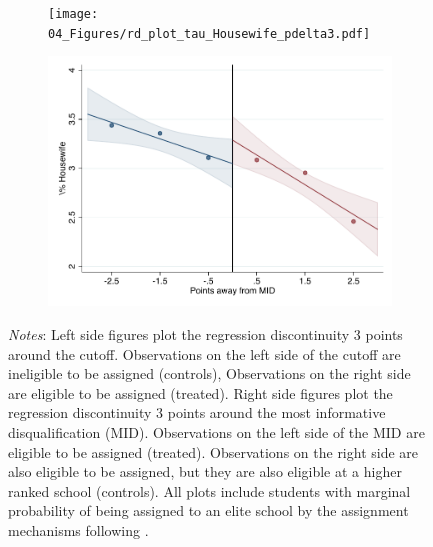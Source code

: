 \documentclass[oneside,11pt]{article}
\begin{document}
\begin{figure}[H]
\begin{center}
    \begin{subfigure}{0.475\textwidth}
        \centering
        \texttt{[image: 04\_Figures/rd\_plot\_tau\_Housewife\_pdelta3.pdf]}
    \end{subfigure}
    \begin{subfigure}{0.475\textwidth}
        \centering
        \includegraphics[width=\textwidth]{04_Figures/rd_plot_mid_Housewife_pdelta3.pdf}
    \end{subfigure}
    \end{center}
    
\footnotesize
\textit{Notes}: Left side figures plot the regression discontinuity 3 points around the cutoff. Observations on the left side of the cutoff are ineligible to be assigned (controls), Observations on the right side are eligible to be assigned (treated). Right side figures plot the regression discontinuity 3 points around the most informative disqualification (MID). Observations on the left side of the MID are eligible to be assigned (treated). Observations on the right side are also eligible to be assigned, but they are also eligible at a higher ranked school (controls). All plots include students with marginal probability of being assigned to an elite school by the assignment mechanisms following \citet{abdulkadirouglu2022breaking}. 
\end{figure}
\end{document}
